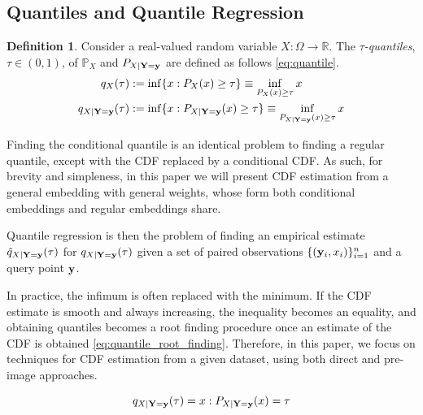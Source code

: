 \documentclass[twoside]{article} \usepackage{aistats2017}
\theoremstyle{definition}
\newtheorem{definition}{Definition}[section]
\theoremstyle{theorem}
\newcommand{\rv}[1]{{#1}}
\begin{document}
	\subsection{Quantiles and Quantile Regression}
	\label{sec:background:quantiles}

		\begin{definition} \label{def:quantile}
			\citep{takeuchi2006nonparametric}
			Consider a real-valued random variable $\rv{X} : \Omega \to \mathbb{R}$. The \textit{$\tau$-quantiles}, $\tau \in (0, 1)$, of $\mathbb{P}_{\rv{X}}$ and $P_{\rv{X} | \bvec{\rv{Y}} = \bvec{y}}$ are defined as follows \eqref{eq:quantile}.
			\begin{equation}
				\begin{aligned}
					q_{\rv{X}}(\tau) &:= \inf\{x : P_{\rv{X}}(x) \geq \tau\} \equiv \inf_{P_{\rv{X}}(x) \geq \tau} x \\
					q_{\rv{X} | \bvec{\rv{Y}} = \bvec{y}}(\tau) &:= \inf\{x : P_{\rv{X} | \bvec{\rv{Y}} = \bvec{y}}(x) \geq \tau\} \equiv \inf_{P_{\rv{X} | \bvec{\rv{Y}} = \bvec{y}}(x) \geq \tau} x
				\end{aligned}
			\label{eq:quantile}
			\end{equation}
		\end{definition}

		Finding the conditional quantile is an identical problem to finding a regular quantile, except with the CDF replaced by a conditional CDF. As such, for brevity and simpleness, in this paper we will present CDF estimation from a general embedding with general weights, whose form both conditional embeddings and regular embeddings share.

		Quantile regression is then the problem of finding an empirical estimate $\hat{q}_{\rv{X} | \bvec{\rv{Y}} = \bvec{y}}(\tau)$ for $q_{\rv{X} | \bvec{\rv{Y}} = \bvec{y}}(\tau)$ given a set of paired observations $\{(\mathbf{y}_{i}, x_{i})\}_{i = 1}^{n}$ and a query point $\mathbf{y}$.
		
		In practice, the infimum is often replaced with the minimum. If the CDF estimate is smooth and always increasing, the inequality becomes an equality, and obtaining quantiles becomes a root finding procedure once an estimate of the CDF is obtained \eqref{eq:quantile_root_finding}. Therefore, in this paper, we focus on techniques for CDF estimation from a given dataset, using both direct and pre-image approaches.
		
		\begin{equation}
			q_{\rv{X} | \bvec{\rv{Y}} = \bvec{y}}(\tau) = x : P_{\rv{X} | \bvec{\rv{Y}} = \bvec{y}}(x) = \tau
		\label{eq:quantile_root_finding}
		\end{equation}	
	
\end{document}
